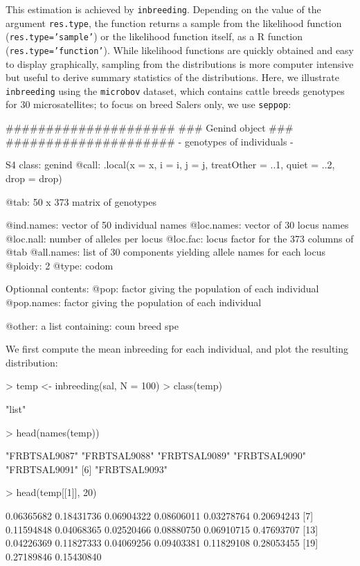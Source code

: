 \documentclass{article}
\begin{document}
This estimation is achieved by \texttt{inbreeding}.
Depending on the value of the argument \texttt{res.type}, the function returns a sample from the
likelihood function (\texttt{res.type='sample'}) or the likelihood function itself, as a R function (\texttt{res.type='function'}).
While likelihood functions are quickly obtained and easy to display graphically, sampling from the
distributions is more computer intensive but useful to derive summary statistics of the distributions.
Here, we illustrate \texttt{inbreeding} using the \texttt{microbov} dataset, which contains cattle
breeds genotypes for 30 microsatellites; to focus on breed Salers only, we use \texttt{seppop}:
\begin{Schunk}
\begin{Soutput}
   #####################
   ### Genind object ### 
   #####################
- genotypes of individuals - 

S4 class:  genind
@call: .local(x = x, i = i, j = j, treatOther = ..1, quiet = ..2, drop = drop)

@tab:  50 x 373 matrix of genotypes

@ind.names: vector of  50 individual names
@loc.names: vector of  30 locus names
@loc.nall: number of alleles per locus
@loc.fac: locus factor for the  373 columns of @tab
@all.names: list of  30 components yielding allele names for each locus
@ploidy:  2
@type:  codom

Optionnal contents: 
@pop:  factor giving the population of each individual
@pop.names:  factor giving the population of each individual

@other: a list containing: coun  breed  spe 
\end{Soutput}
\end{Schunk}
We first compute the mean inbreeding for each individual, and plot the resulting distribution:
\begin{Schunk}
\begin{Sinput}
> temp <- inbreeding(sal, N = 100)
> class(temp)
\end{Sinput}
\begin{Soutput}
[1] "list"
\end{Soutput}
\begin{Sinput}
> head(names(temp))
\end{Sinput}
\begin{Soutput}
[1] "FRBTSAL9087" "FRBTSAL9088" "FRBTSAL9089" "FRBTSAL9090" "FRBTSAL9091"
[6] "FRBTSAL9093"
\end{Soutput}
\begin{Sinput}
> head(temp[[1]], 20)
\end{Sinput}
\begin{Soutput}
 [1] 0.06365682 0.18431736 0.06904322 0.08606011 0.03278764 0.20694243
 [7] 0.11594848 0.04068365 0.02520466 0.08880750 0.06910715 0.47693707
[13] 0.04226369 0.11827333 0.04069256 0.09403381 0.11829108 0.28053455
[19] 0.27189846 0.15430840
\end{Soutput}
\end{Schunk}
\end{document}
